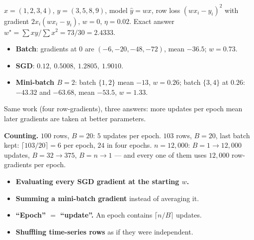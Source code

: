 \documentclass[11pt]{article}
\begin{document}
\begin{worked}
$x = (1,2,3,4)$, $y = (3,5,8,9)$, model $\hat y = wx$, row loss
$(wx_i - y_i)^2$ with gradient $2x_i(wx_i - y_i)$, $w = 0$, $\eta = 0.02$.
Exact answer $w^\star = \sum xy/\sum x^2 = 73/30 = 2.4333$.
\begin{itemize}
  \item \textbf{Batch}: gradients at $0$ are $(-6, -20, -48, -72)$, mean
    $-36.5$; $w = 0.73$.
  \item \textbf{SGD}: $0.12,\ 0.5008,\ 1.2805,\ \mathbf{1.9010}$.
  \item \textbf{Mini-batch $B = 2$}: batch $\{1,2\}$ mean $-13$, $w = 0.26$;
    batch $\{3,4\}$ at $0.26$: $-43.32$ and $-63.68$, mean $-53.5$,
    $w = \mathbf{1.33}$.
\end{itemize}
Same work (four row-gradients), three answers: more updates per epoch mean
later gradients are taken at better parameters.

\textbf{Counting.} $100$ rows, $B = 20$: $5$ updates per epoch. $103$ rows,
$B = 20$, last batch kept: $\lceil 103/20\rceil = 6$ per epoch, $24$ in four
epochs. $n = 12{,}000$: $B = 1 \to 12{,}000$ updates, $B = 32 \to 375$,
$B = n \to 1$ --- and every one of them uses $12{,}000$ row-gradients per
epoch.
\end{worked}

\begin{caution}
\begin{itemize}
  \item \textbf{Evaluating every SGD gradient at the starting $w$.}
  \item \textbf{Summing a mini-batch gradient} instead of averaging it.
  \item \textbf{``Epoch'' $=$ ``update''.} An epoch contains $\lceil n/B\rceil$
    updates.
  \item \textbf{Shuffling time-series rows} as if they were independent.
\end{itemize}
\end{caution}
\end{document}
